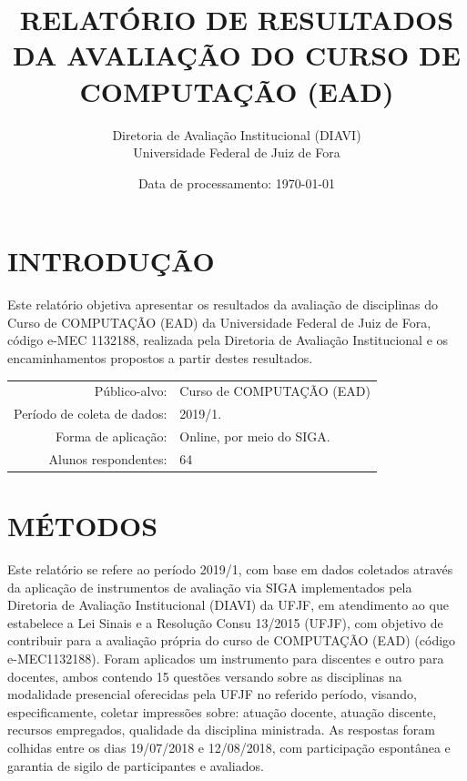 \documentclass[a4paper,10pt]{article}
\date{Data de processamento: \today}
\begin{document}
\author{Diretoria de Avaliação Institucional (DIAVI) \\ Universidade Federal de Juiz de Fora}

\title{RELATÓRIO DE RESULTADOS DA AVALIAÇÃO DO CURSO DE COMPUTAÇÃO (EAD)}
\maketitle
\section{INTRODUÇÃO}
Este relatório objetiva apresentar os resultados da avaliação de disciplinas do Curso     de COMPUTAÇÃO (EAD) da Universidade Federal de Juiz de Fora, código e-MEC 1132188, realizada pela     Diretoria de Avaliação Institucional e os encaminhamentos propostos a     partir destes resultados.

\begin{center}
\begin{tabularx}{\linewidth}{r|X}

Público-alvo:& Curso de COMPUTAÇÃO (EAD)\\

Período de coleta de dados:& 2019/1.\\

Forma de aplicação:& Online, por meio do SIGA.\\

Alunos respondentes:& 64\\
\end{tabularx}
\end{center}

\section{MÉTODOS}
Este relatório se refere ao período 2019/1, com base em dados     coletados através da aplicação de instrumentos de avaliação via SIGA     implementados pela Diretoria de Avaliação Institucional (DIAVI) da UFJF, em atendimento     ao que estabelece a Lei Sinais e a Resolução Consu 13/2015 (UFJF),     com objetivo de contribuir para a avaliação própria do curso de COMPUTAÇÃO (EAD) (código e-MEC1132188). Foram aplicados um instrumento para discentes e outro para docentes, ambos contendo     15 questões versando sobre as disciplinas na modalidade presencial oferecidas pela UFJF no     referido período, visando, especificamente, coletar impressões sobre: atuação docente, atuação discente,     recursos empregados, qualidade da disciplina ministrada.     As respostas foram colhidas entre os dias 19/07/2018 e 12/08/2018, com participação espontânea e garantia de    sigilo de participantes e avaliados.
\end{document}
